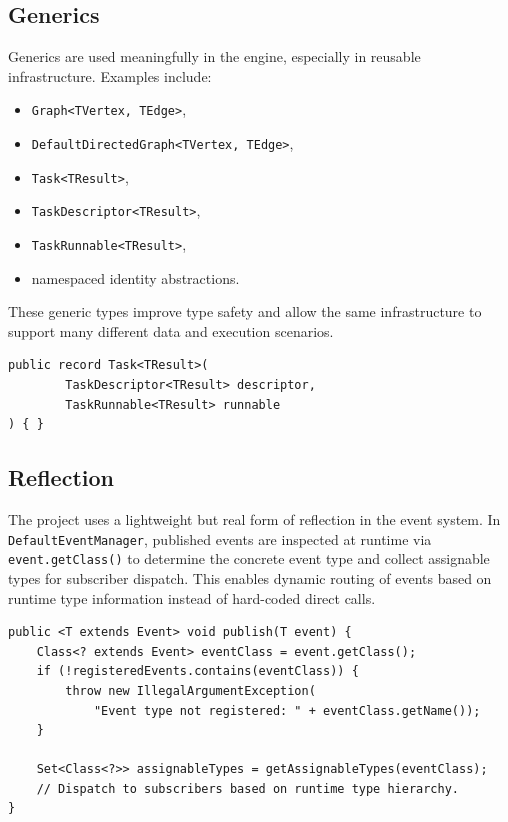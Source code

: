 \documentclass[12pt]{extarticle}
\begin{document}
\subsection{Generics}
Generics are used meaningfully in the engine, especially in reusable infrastructure. Examples include:
\begin{itemize}[leftmargin=1.5em]
    \item \texttt{Graph<TVertex, TEdge>},
    \item \texttt{DefaultDirectedGraph<TVertex, TEdge>},
    \item \texttt{Task<TResult>},
    \item \texttt{TaskDescriptor<TResult>},
    \item \texttt{TaskRunnable<TResult>},
    \item namespaced identity abstractions.
\end{itemize}

These generic types improve type safety and allow the same infrastructure to support many different data and execution scenarios.

\begin{lstlisting}[caption={Generic task abstraction used by the workflow infrastructure}]
public record Task<TResult>(
        TaskDescriptor<TResult> descriptor,
        TaskRunnable<TResult> runnable
) { }
\end{lstlisting}

\subsection{Reflection}
The project uses a lightweight but real form of reflection in the event system. In \texttt{DefaultEventManager}, published events are inspected at runtime via \texttt{event.getClass()} to determine the concrete event type and collect assignable types for subscriber dispatch. This enables dynamic routing of events based on runtime type information instead of hard-coded direct calls.

\begin{lstlisting}[caption={Runtime type inspection used for event dispatch}]
public <T extends Event> void publish(T event) {
    Class<? extends Event> eventClass = event.getClass();
    if (!registeredEvents.contains(eventClass)) {
        throw new IllegalArgumentException(
            "Event type not registered: " + eventClass.getName());
    }

    Set<Class<?>> assignableTypes = getAssignableTypes(eventClass);
    // Dispatch to subscribers based on runtime type hierarchy.
}
\end{lstlisting}
\end{document}
